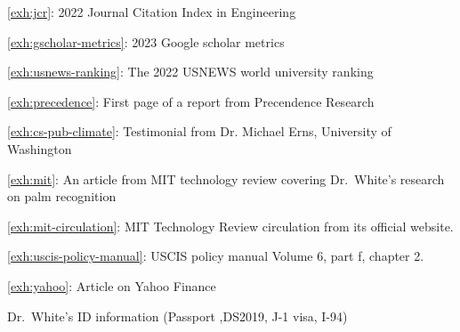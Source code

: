 \documentclass{article}
\newcommand{\lname}{White}
\newcommand{\drfn}{Dr.~\lname}
\newcounter{exhibit}
\begin{document}
\begin{center}
    \Large{\ref{exh:jcr}: 2022 Journal Citation Index in Engineering}
\end{center}
% 
\pagebreak

\begin{center}
    \Large{\ref{exh:gscholar-metrics}: 2023 Google scholar metrics}
\end{center}
% 
\pagebreak

\begin{center}
    \Large{\ref{exh:usnews-ranking}:  The 2022 USNEWS world university ranking}
\end{center}
% 
\pagebreak

\begin{center}
    \Large{\ref{exh:precedence}: First page of a report from Precendence Research}
\end{center}
% 
\pagebreak


\begin{center}
    \Large{\ref{exh:cs-pub-climate}: Testimonial from Dr. Michael Erns, University of Washington}
\end{center}
% 
\pagebreak

\begin{center}
    \Large{\ref{exh:mit}: An article from MIT technology review covering \drfn's research on palm recognition }
\end{center}
\pagebreak


\begin{center}
    \Large{\ref{exh:mit-circulation}: MIT Technology Review circulation from its official website.}
\end{center}
\pagebreak
% 


\begin{center}
    \Large{\ref{exh:uscis-policy-manual}: USCIS policy manual Volume 6, part f, chapter 2.}
\end{center}
\pagebreak
% 


\begin{center}
    \Large{\ref{exh:yahoo}: 
    Article on Yahoo Finance}
\end{center}
% 
\pagebreak

\begin{center}
    \Large{\drfn's ID information (Passport ,DS2019, J-1 visa, I-94)}
\end{center}
\pagebreak

% 
\end{document}
